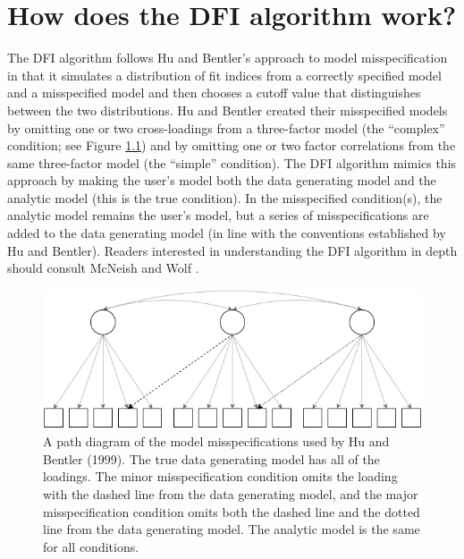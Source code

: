 \documentclass[
]{book}
\begin{document}
\hypertarget{algorithm}{%
\chapter{How does the DFI algorithm work?}\label{algorithm}}

The DFI algorithm follows Hu and Bentler's \citeyearpar{hu_cutoff_1999} approach to model misspecification in that it simulates a distribution of fit indices from a correctly specified model and a misspecified model and then chooses a cutoff value that distinguishes between the two distributions. Hu and Bentler created their misspecified models by omitting one or two cross-loadings from a three-factor model (the ``complex'' condition; see Figure \ref{fig:hb}) and by omitting one or two factor correlations from the same three-factor model (the ``simple'' condition). The DFI algorithm mimics this approach by making the user's model both the data generating model and the analytic model (this is the true condition). In the misspecified condition(s), the analytic model remains the user's model, but a series of misspecifications are added to the data generating model (in line with the conventions established by Hu and Bentler). Readers interested in understanding the DFI algorithm in depth should consult McNeish and Wolf \citetext{\citeyear{mcneish_dynamic_2021}; \citeyear{mcneish_dynamic_2022}}.

\begin{figure}

{\centering \includegraphics{hb path diagram} 

}

\caption{A path diagram of the model misspecifications used by Hu and Bentler (1999). The true data generating model has all of the loadings. The minor misspecification condition omits the loading with the dashed line from the data generating model, and the major misspecification condition omits both the dashed line and the dotted line from the data generating model. The analytic model is the same for all conditions.}\label{fig:hb}
\end{figure}
\end{document}
